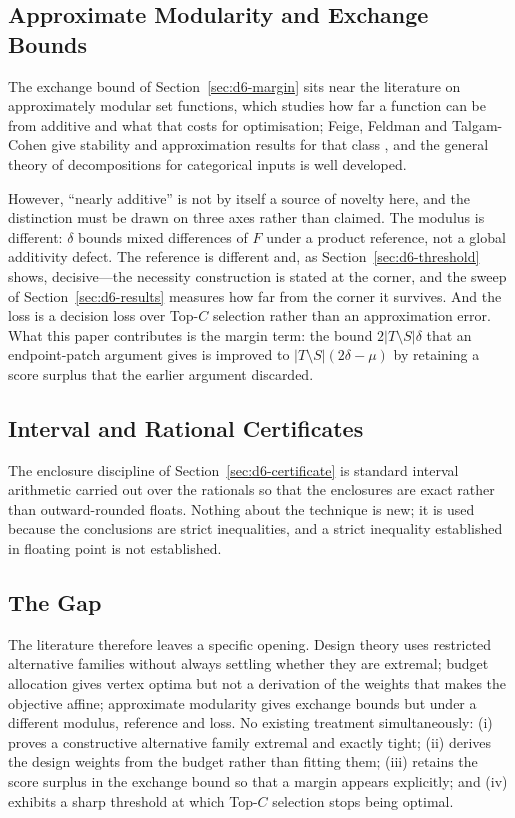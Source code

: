 \subsection{Approximate Modularity and Exchange Bounds}

The exchange bound of Section~\ref{sec:d6-margin} sits near the literature on approximately
modular set functions, which studies how far a function can be from additive and what that
costs for optimisation; Feige, Feldman and Talgam-Cohen give stability and approximation
results for that class \cite{feige2020}, and the general theory of decompositions for
categorical inputs is well developed.

However, ``nearly additive'' is not by itself a source of novelty here, and the distinction
must be drawn on three axes rather than claimed. The modulus is different: $\delta$ bounds
mixed differences of $F$ under a product reference, not a global additivity defect. The
reference is different and, as Section~\ref{sec:d6-threshold} shows, decisive---the necessity
construction is stated at the corner, and the sweep of Section~\ref{sec:d6-results} measures how
far from the corner it survives. And the loss is a decision loss over
Top-$C$ selection rather than an approximation error. What this paper contributes is the
margin term: the bound $2|T\setminus S|\delta$ that an endpoint-patch argument gives is
improved to $|T\setminus S|(2\delta-\mu)$ by retaining a score surplus that the earlier
argument discarded.

\subsection{Interval and Rational Certificates}

The enclosure discipline of Section~\ref{sec:d6-certificate} is standard interval arithmetic
\cite{moore2009} carried out over the rationals so that the enclosures are exact rather than
outward-rounded floats. Nothing about the technique is new; it is used because the
conclusions are strict inequalities, and a strict inequality established in floating point is
not established.

\subsection{The Gap}

The literature therefore leaves a specific opening. Design theory uses restricted alternative
families without always settling whether they are extremal; budget allocation gives vertex
optima but not a derivation of the weights that makes the objective affine; approximate
modularity gives exchange bounds but under a different modulus, reference and loss. No
existing treatment simultaneously: (i) proves a constructive alternative family extremal and
exactly tight; (ii) derives the design weights from the budget rather than fitting them;
(iii) retains the score surplus in the exchange bound so that a margin appears explicitly;
and (iv) exhibits a sharp threshold at which Top-$C$ selection stops being optimal.


